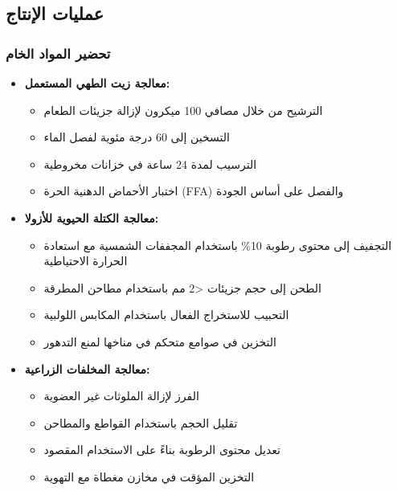 \subsection{عمليات الإنتاج}

\subsubsection{تحضير المواد الخام}
\begin{itemize}
    \item \textbf{معالجة زيت الطهي المستعمل:}
    \begin{itemize}
        \item الترشيح من خلال مصافي 100 ميكرون لإزالة جزيئات الطعام
        \item التسخين إلى 60 درجة مئوية لفصل الماء
        \item الترسيب لمدة 24 ساعة في خزانات مخروطية
        \item اختبار الأحماض الدهنية الحرة (FFA) والفصل على أساس الجودة
    \end{itemize}
    
    \item \textbf{معالجة الكتلة الحيوية للأزولا:}
    \begin{itemize}
        \item التجفيف إلى محتوى رطوبة 10\% باستخدام المجففات الشمسية مع استعادة الحرارة الاحتياطية
        \item الطحن إلى حجم جزيئات <2 مم باستخدام مطاحن المطرقة
        \item التحبيب للاستخراج الفعال باستخدام المكابس اللولبية
        \item التخزين في صوامع متحكم في مناخها لمنع التدهور
    \end{itemize}
    
    \item \textbf{معالجة المخلفات الزراعية:}
    \begin{itemize}
        \item الفرز لإزالة الملوثات غير العضوية
        \item تقليل الحجم باستخدام القواطع والمطاحن
        \item تعديل محتوى الرطوبة بناءً على الاستخدام المقصود
        \item التخزين المؤقت في مخازن مغطاة مع التهوية
    \end{itemize}
\end{itemize}

